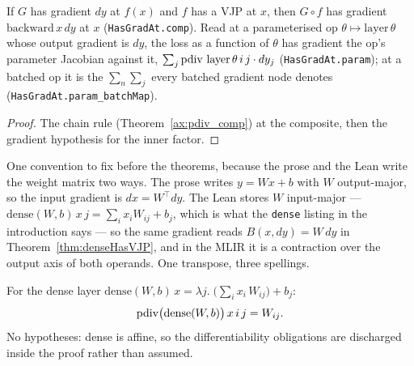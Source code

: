 \begin{theorem}
  \label{thm:hasGradAt_comp}
  \leanok
  If \(G\) has gradient \(dy\) at \(f(x)\) and \(f\) has a VJP at \(x\), then
  \(G \circ f\) has gradient \(\mathrm{backward}\,x\,dy\) at \(x\)
  (\texttt{HasGradAt.comp}). Read at a parameterised op
  \(\theta \mapsto \mathrm{layer}\,\theta\) whose output gradient is \(dy\),
  the loss as a function of \(\theta\) has gradient the op's parameter
  Jacobian against it, \(\sum_j \operatorname{pdiv}\,\mathrm{layer}\,\theta\,i\,j \cdot dy_j\)
  (\texttt{HasGradAt.param}); at a batched op it is the \(\sum_n \sum_j\) every
  batched gradient node denotes (\texttt{HasGradAt.param\_batchMap}).
\end{theorem}

\begin{proof}
\leanok
The chain rule (Theorem~\ref{ax:pdiv_comp}) at the composite, then the
gradient hypothesis for the inner factor.
\end{proof}

One convention to fix before the theorems, because the prose and the
Lean write the weight matrix two ways. The prose writes \(y = Wx + b\)
with \(W\) output-major, so the input gradient is \(dx = W^{\top} dy\).
The Lean stores \(W\) input-major ---
\(\mathrm{dense}(W, b)\, x\, j = \sum_i x_i W_{ij} + b_j\), which is what
the \texttt{dense} listing in the introduction says --- so the same
gradient reads \(B(x, dy) = W\, dy\) in Theorem~\ref{thm:denseHasVJP},
and in the MLIR it is a contraction over the output axis of both
operands. One transpose, three spellings.

\begin{theorem}
  \label{ax:pdiv_dense}
  \leanok
  For the dense layer
  \(\mathrm{dense}(W, b)\, x = \lambda j.\; \bigl(\sum_i x_i\, W_{ij}\bigr) + b_j\):
  \[
    \operatorname{pdiv}\bigl(\mathrm{dense}(W, b)\bigr)\, x\, i\, j = W_{ij}.
  \]
  No hypotheses: dense is affine, so the differentiability obligations
  are discharged inside the proof rather than assumed.
\end{theorem}

